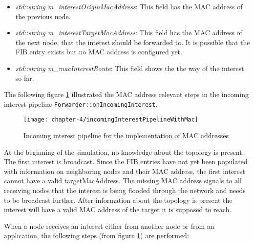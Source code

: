 \clearpage

\begin{itemize}
\item \emph{std::string m\_interestOriginMacAddress}: This field has the MAC address of the previous node.
\item \emph{std::string m\_interestTargetMacAddress}: This field has the MAC address of the next node, that the interest should be forwarded to. It is possible that the FIB entry exists but no MAC address is configured yet.
\item \emph{std::string m\_macInterestRoute}: This field shows the the way of the interest so far.
\end{itemize}

The following figure \ref{fig:incomingInterestPipelineWithMac} illustrated the MAC address relevant steps in the incoming interest pipeline \texttt{Forwarder::onIncomingInterest}.

\vspace{5mm} %

\begin{figure}[H]
  \centering
  \texttt{[image: chapter-4/incomingInterestPipelineWithMac]}
  \caption{Incoming interest pipeline for the implementation of MAC addresses}
  \label{fig:incomingInterestPipelineWithMac}
\end{figure}

\vspace{5mm} %

At the beginning of the simulation, no knowledge about the topology is present. The first interest is broadcast. Since the FIB entries have not yet been populated with information on neighboring nodes and their MAC address, the first interest cannot have a valid targetMacAddress. The missing MAC address signals to all receiving nodes that the interest is being flooded through the network and needs to be broadcast further. After information about the topology is present the interest will have a valid MAC address of the target it is supposed to reach.

When a node receives an interest either from another node or from an application, the following steps (from figure \ref{fig:incomingInterestPipelineWithMac}) are performed:

